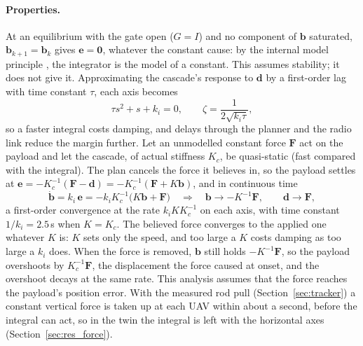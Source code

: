 \paragraph{Properties.} At an equilibrium with the gate open ($G = I$) and no component of $\mathbf{b}$
saturated, $\mathbf{b}_{k+1} = \mathbf{b}_k$ gives $\mathbf{e} = \mathbf{0}$, whatever the constant cause:
by the internal model principle \cite{francis1976internal}, the integrator is the model of a constant.
This assumes stability; it does not give it. Approximating the cascade's response to $\mathbf{d}$ by a
first-order lag with time constant $\tau$, each axis becomes
\begin{equation}
    \tau s^2 + s + k_i = 0, \qquad \zeta = \frac{1}{2\sqrt{k_i \tau}},
\end{equation}
so a faster integral costs damping, and delays through the planner and the radio link reduce the margin
further. Let an unmodelled constant force
$\mathbf{F}$ act on the payload and let the cascade, of actual stiffness $K_c$, be quasi-static (fast
compared with the integral). The plan cancels the force it believes in, so the payload settles at
$\mathbf{e} = -K_c^{-1}(\mathbf{F} - \mathbf{d}) = -K_c^{-1}(\mathbf{F} + K\mathbf{b})$, and in continuous time
\begin{equation}
    \dot{\mathbf{b}} = k_i\,\mathbf{e} = -k_i K_c^{-1}\big(K\mathbf{b} + \mathbf{F}\big)
    \quad\Rightarrow\quad \mathbf{b} \to -K^{-1}\mathbf{F}, \qquad \mathbf{d} \to \mathbf{F},
\end{equation}
a first-order convergence at the rate $k_i K K_c^{-1}$ on each axis, with time constant $1/k_i = 2.5$\,s when
$K = K_c$. The believed force converges to the applied one whatever $K$ is: $K$ sets only the speed, and
too large a $K$ costs damping as too large a $k_i$ does. When the force is removed, $\mathbf{b}$ still holds
$-K^{-1}\mathbf{F}$, so the payload overshoots by $K_c^{-1}\mathbf{F}$, the displacement the force caused at
onset, and the overshoot decays at the same rate. This analysis assumes that the force reaches the payload's
position error. With the measured rod pull (Section~\ref{sec:tracker}) a constant vertical force is taken up at
each UAV within about a second, before the integral can act, so in the twin the integral is left with the
horizontal axes (Section~\ref{sec:res_force}).

